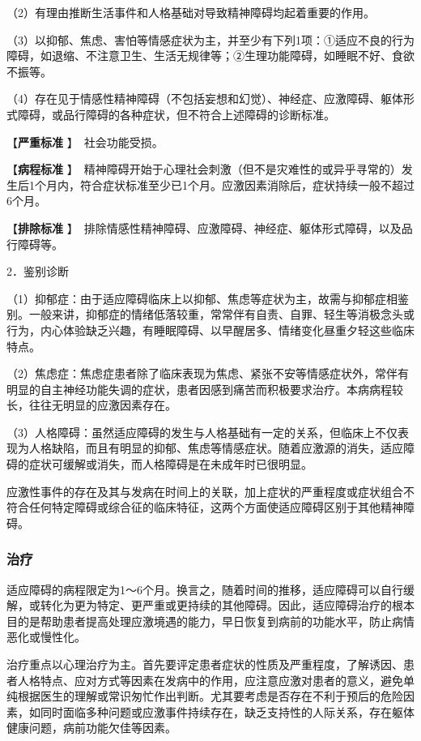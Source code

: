 （2）有理由推断生活事件和人格基础对导致精神障碍均起着重要的作用。

（3）以抑郁、焦虑、害怕等情感症状为主，并至少有下列1项：①适应不良的行为障碍，如退缩、不注意卫生、生活无规律等；②生理功能障碍，如睡眠不好、食欲不振等。

（4）存在见于情感性精神障碍（不包括妄想和幻觉）、神经症、应激障碍、躯体形式障碍，或品行障碍的各种症状，但不符合上述障碍的诊断标准。

【\textbf{严重标准} 】　社会功能受损。

【\textbf{病程标准}
】　精神障碍开始于心理社会刺激（但不是灾难性的或异乎寻常的）发生后1个月内，符合症状标准至少已1个月。应激因素消除后，症状持续一般不超过6个月。

【\textbf{排除标准}
】　排除情感性精神障碍、应激障碍、神经症、躯体形式障碍，以及品行障碍等。

2．鉴别诊断

（1）抑郁症：由于适应障碍临床上以抑郁、焦虑等症状为主，故需与抑郁症相鉴别。一般来讲，抑郁症的情绪低落较重，常常伴有自责、自罪、轻生等消极念头或行为，内心体验缺乏兴趣，有睡眠障碍、以早醒居多、情绪变化昼重夕轻这些临床特点。

（2）焦虑症：焦虑症患者除了临床表现为焦虑、紧张不安等情感症状外，常伴有明显的自主神经功能失调的症状，患者因感到痛苦而积极要求治疗。本病病程较长，往往无明显的应激因素存在。

（3）人格障碍：虽然适应障碍的发生与人格基础有一定的关系，但临床上不仅表现为人格缺陷，而且有明显的抑郁、焦虑等情感症状。随着应激源的消失，适应障碍的症状可缓解或消失，而人格障碍是在未成年时已很明显。

应激性事件的存在及其与发病在时间上的关联，加上症状的严重程度或症状组合不符合任何特定障碍或综合征的临床特征，这两个方面使适应障碍区别于其他精神障碍。

\subsubsection{治疗}

适应障碍的病程限定为1～6个月。换言之，随着时间的推移，适应障碍可以自行缓解，或转化为更为特定、更严重或更持续的其他障碍。因此，适应障碍治疗的根本目的是帮助患者提高处理应激境遇的能力，早日恢复到病前的功能水平，防止病情恶化或慢性化。

治疗重点以心理治疗为主。首先要评定患者症状的性质及严重程度，了解诱因、患者人格特点、应对方式等因素在发病中的作用，应注意应激对患者的意义，避免单纯根据医生的理解或常识匆忙作出判断。尤其要考虑是否存在不利于预后的危险因素，如同时面临多种问题或应激事件持续存在，缺乏支持性的人际关系，存在躯体健康问题，病前功能欠佳等因素。

